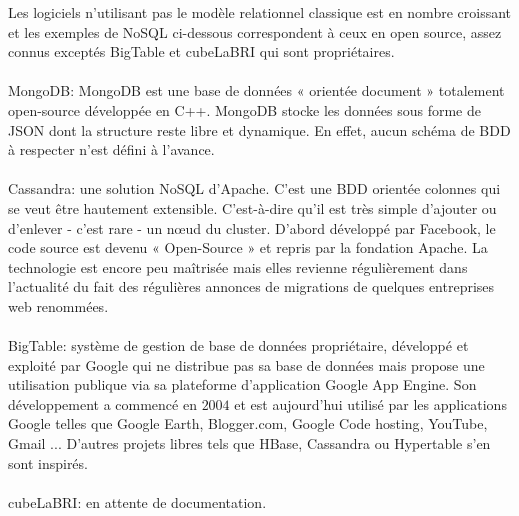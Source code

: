 Les logiciels n'utilisant pas le modèle relationnel classique est en
nombre croissant et les exemples de \textsf{NoSQL} ci-dessous correspondent à ceux en open source, assez connus exceptés
\textsf{BigTable} et \textsf{cubeLaBRI} qui sont propriétaires.
\\\\ {\sf MongoDB}: MongoDB est une base de données « \textsf{orientée
    document} » totalement open-source développée en
\textsf{C++}. MongoDB stocke les données sous forme de \textsf{JSON}
dont la structure reste libre et dynamique.  En effet, aucun schéma de
\textsf{BDD} à respecter n'est défini à
l'avance.\cite{mongoDB} \\\\ \textsf{Cassandra}:  une
solution \textsf{NoSQL} d’\textsf{Apache}.  C’est une \textsf{BDD} orientée colonnes
qui se veut être hautement extensible. C’est-à-dire qu’il est très
simple d’ajouter ou d’enlever - c’est rare - un nœud du
cluster. D’abord développé par \textsf{Facebook}, le code source est devenu
« \textsf{Open-Source} » et repris par la fondation \textsf{Apache}\cite{cassandra}.  La
technologie est encore peu maîtrisée mais elles revienne régulièrement
dans l’actualité du fait des régulières annonces de migrations de
quelques entreprises \textsf{web} renommées\cite{cassandra2}.
\\\\ \textsf{BigTable}:  système de gestion de base de
données propriétaire, développé et exploité par Google qui ne
distribue pas sa base de données mais propose une utilisation publique
via sa plateforme d'application \textsf{Google App Engine}. Son
développement a commencé en $2004$ et est aujourd'hui utilisé par les
applications \textsf{Google} telles que \textsf{Google Earth},
\textsf{Blogger.com}, \textsf{Google Code hosting}, \textsf{YouTube},
\textsf{Gmail} ... D'autres projets libres tels que \textsf{HBase},
\textsf{Cassandra} ou \textsf{Hypertable} s'en sont
inspirés.\\\\ {\color{red} \textsf{cubeLaBRI}: en
  attente de documentation.}
